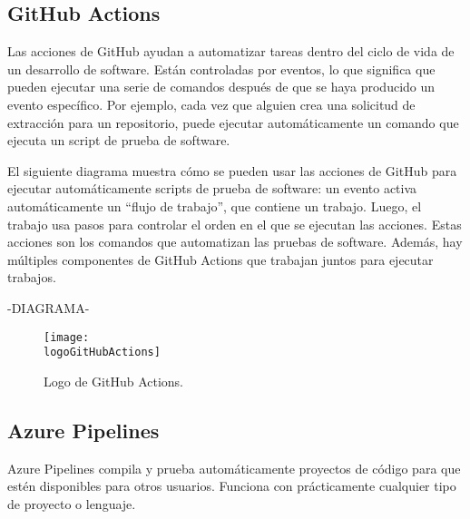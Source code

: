 \subsection{GitHub Actions}
Las acciones de GitHub ayudan a automatizar tareas dentro del ciclo de vida de un desarrollo de software. Están controladas por eventos, lo que significa que pueden ejecutar una serie de comandos después de que se haya producido un evento específico. Por ejemplo, cada vez que alguien crea una solicitud de extracción para un repositorio, puede ejecutar automáticamente un comando que ejecuta un script de prueba de software.

El siguiente diagrama muestra cómo se pueden usar las acciones de GitHub para ejecutar automáticamente scripts de prueba de software: un evento activa automáticamente un “flujo de trabajo”, que contiene un trabajo. Luego, el trabajo usa pasos para controlar el orden en el que se ejecutan las acciones. Estas acciones son los comandos que automatizan las pruebas de software. Además, hay múltiples componentes de GitHub Actions que trabajan juntos para ejecutar trabajos.

-DIAGRAMA-

\begin{figure}[h]
    \centering
    \texttt{[image: \\logoGitHubActions]}
    \caption{Logo de GitHub Actions.}
\end{figure}

\subsection{Azure Pipelines}
Azure Pipelines compila y prueba automáticamente proyectos de código para que estén disponibles para otros usuarios. Funciona con prácticamente cualquier tipo de proyecto o lenguaje.

